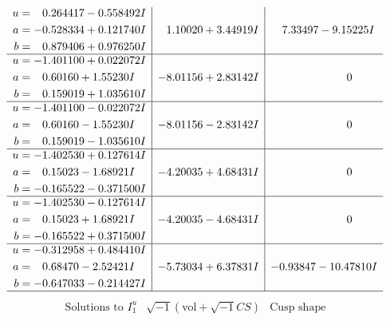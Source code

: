 \documentclass[1p]{elsarticle_modified}
\theoremstyle{definition}
\newcommand{\I}{\sqrt{-1}}
\begin{document}
$$\begin{array}{c|c|c}
\begin{aligned}
u &= \phantom{-}0.264417 - 0.558492 I \\
a &= -0.528334 + 0.121740 I \\
b &= \phantom{-}0.879406 + 0.976250 I\end{aligned}
 & \phantom{-}1.10020 + 3.44919 I & \phantom{-}7.33497 - 9.15225 I \\ \hline\begin{aligned}
u &= -1.401100 + 0.022072 I \\
a &= \phantom{-}0.60160 + 1.55230 I \\
b &= \phantom{-}0.159019 + 1.035610 I\end{aligned}
 & -8.01156 + 2.83142 I & \phantom{-0.000000 } 0 \\ \hline\begin{aligned}
u &= -1.401100 - 0.022072 I \\
a &= \phantom{-}0.60160 - 1.55230 I \\
b &= \phantom{-}0.159019 - 1.035610 I\end{aligned}
 & -8.01156 - 2.83142 I & \phantom{-0.000000 } 0 \\ \hline\begin{aligned}
u &= -1.402530 + 0.127614 I \\
a &= \phantom{-}0.15023 - 1.68921 I \\
b &= -0.165522 - 0.371500 I\end{aligned}
 & -4.20035 + 4.68431 I & \phantom{-0.000000 } 0 \\ \hline\begin{aligned}
u &= -1.402530 - 0.127614 I \\
a &= \phantom{-}0.15023 + 1.68921 I \\
b &= -0.165522 + 0.371500 I\end{aligned}
 & -4.20035 - 4.68431 I & \phantom{-0.000000 } 0 \\ \hline\begin{aligned}
u &= -0.312958 + 0.484410 I \\
a &= \phantom{-}0.68470 - 2.52421 I \\
b &= -0.647033 - 0.214427 I\end{aligned}
 & -5.73034 + 6.37831 I & -0.93847 - 10.47810 I\\
 \hline 
 \end{array}$$\newpage$$\begin{array}{c|c|c}  
\text{Solutions to }I^u_{1}& \I (\text{vol} + \sqrt{-1}CS) & \text{Cusp shape}\\
 \hline 
\begin{aligned}

\end{aligned}
\end{array}$$
\end{document}
